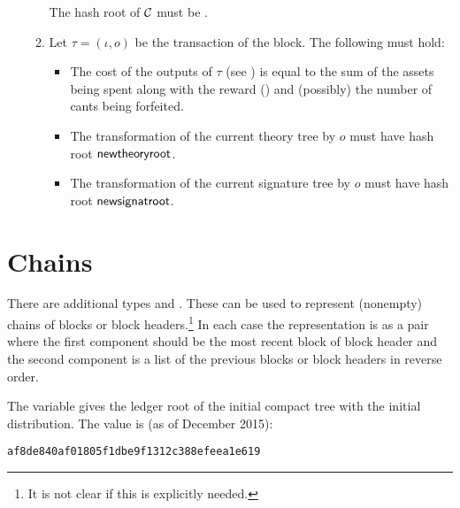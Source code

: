 \begin{itemize}
\begin{enumerate}
The hash root of $\mathcal{C}$ must be {}.
\item Let $\tau=(\iota,o)$ be the transaction of the block. The following must hold:
\begin{itemize}
\item The cost of the outputs of $\tau$ (see {})
is equal to the sum of the assets being spent
along with the reward ({})
and (possibly) the number of cants being forfeited.
\item The transformation of the current theory tree by $o$ must have hash root $\field{newtheoryroot}$.
\item The transformation of the current signature tree by $o$ must have hash root $\field{newsignatroot}$.
\end{itemize}
\end{enumerate}
\end{itemize}

\section{Chains}

There are additional types
{}
and 
{}.
These can be used to represent (nonempty) chains of blocks or block headers.\footnote{It is not clear if this is explicitly needed.}
In each case the representation is as a pair
where the first component should be the most recent block of block header
and the second component is a list of the previous blocks or block headers
in reverse order.

The variable {} gives the ledger root of the initial compact tree
with the initial distribution. The value is (as of December 2015):
\begin{verbatim}
af8de840af01805f1dbe9f1312c388efeea1e619
\end{verbatim}

